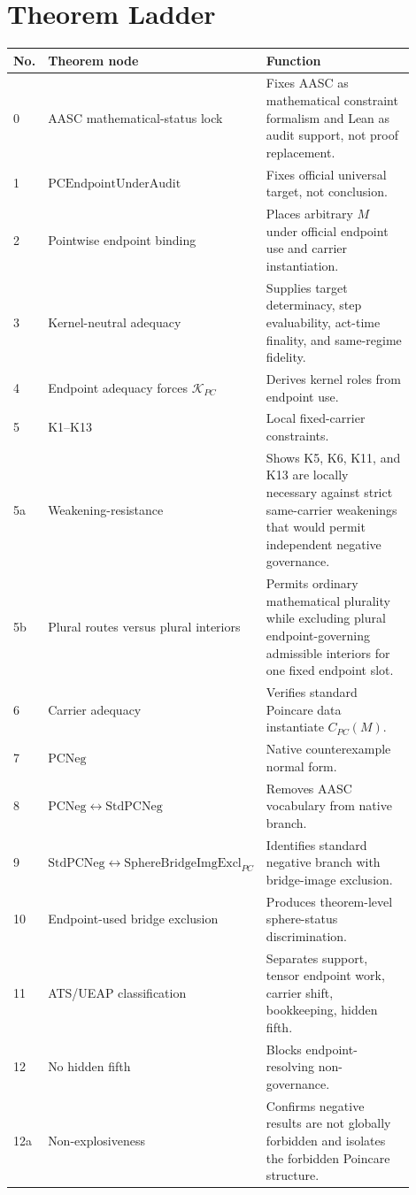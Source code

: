 \documentclass[11pt]{article}
\newcommand{\CarrierPC}{C_{PC}}
\newcommand{\KPC}{\mathcal{K}_{PC}}
\newcommand{\PCEndpoint}{\mathrm{PCEndpointUnderAudit}}
\newcommand{\PCNeg}{\mathrm{PCNeg}}
\newcommand{\StdPCNeg}{\mathrm{StdPCNeg}}
\newcommand{\SphereBridgeImgExcl}{\mathrm{SphereBridgeImgExcl}_{PC}}
\begin{document}
\section{Theorem Ladder}
\begin{longtable}{L{0.08\linewidth}L{0.42\linewidth}L{0.40\linewidth}}
\toprule
\textbf{No.} & \textbf{Theorem node} & \textbf{Function}\\
 & AASC mathematical-status lock & Fixes AASC as mathematical constraint formalism and Lean as audit support, not proof replacement.\\
1 & \(\PCEndpoint\) & Fixes official universal target, not conclusion.\\
2 & Pointwise endpoint binding & Places arbitrary \(M\) under official endpoint use and carrier instantiation.\\
3 & Kernel-neutral adequacy & Supplies target determinacy, step evaluability, act-time finality, and same-regime fidelity.\\
4 & Endpoint adequacy forces \(\KPC\) & Derives kernel roles from endpoint use.\\
5 & K1--K13 & Local fixed-carrier constraints.\\
5a & Weakening-resistance & Shows K5, K6, K11, and K13 are locally necessary against strict same-carrier weakenings that would permit independent negative governance.\\
5b & Plural routes versus plural interiors & Permits ordinary mathematical plurality while excluding plural endpoint-governing admissible interiors for one fixed endpoint slot.\\
6 & Carrier adequacy & Verifies standard Poincare data instantiate \(\CarrierPC(M)\).\\
7 & \(\PCNeg\) & Native counterexample normal form.\\
8 & \(\PCNeg\leftrightarrow\StdPCNeg\) & Removes AASC vocabulary from native branch.\\
9 & \(\StdPCNeg\leftrightarrow\SphereBridgeImgExcl\) & Identifies standard negative branch with bridge-image exclusion.\\
10 & Endpoint-used bridge exclusion & Produces theorem-level sphere-status discrimination.\\
11 & ATS/UEAP classification & Separates support, tensor endpoint work, carrier shift, bookkeeping, hidden fifth.\\
12 & No hidden fifth & Blocks endpoint-resolving non-governance.\\
12a & Non-explosiveness & Confirms negative results are not globally forbidden and isolates the forbidden Poincare structure.\\

\end{longtable}
\end{document}
